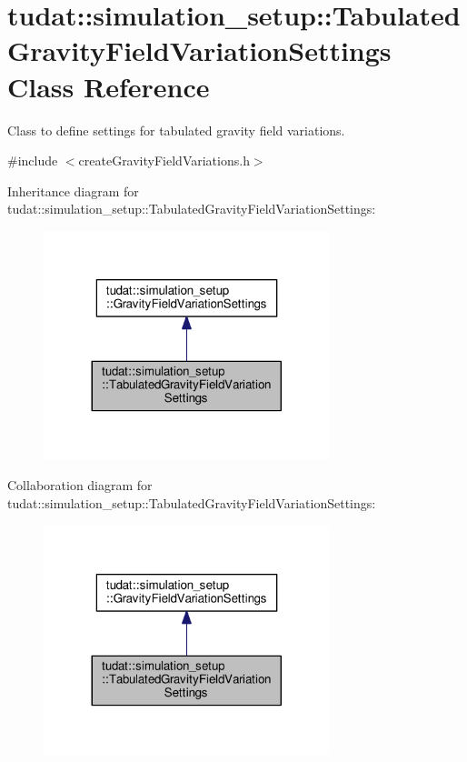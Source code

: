 \hypertarget{classtudat_1_1simulation__setup_1_1TabulatedGravityFieldVariationSettings}{}\section{tudat\+:\+:simulation\+\_\+setup\+:\+:Tabulated\+Gravity\+Field\+Variation\+Settings Class Reference}
\label{classtudat_1_1simulation__setup_1_1TabulatedGravityFieldVariationSettings}


Class to define settings for tabulated gravity field variations.  




{\ttfamily \#include $<$create\+Gravity\+Field\+Variations.\+h$>$}



Inheritance diagram for tudat\+:\+:simulation\+\_\+setup\+:\+:Tabulated\+Gravity\+Field\+Variation\+Settings\+:
\nopagebreak
\begin{figure}[H]
\begin{center}
\leavevmode
\includegraphics[width=236pt]{classtudat_1_1simulation__setup_1_1TabulatedGravityFieldVariationSettings__inherit__graph}
\end{center}
\end{figure}


Collaboration diagram for tudat\+:\+:simulation\+\_\+setup\+:\+:Tabulated\+Gravity\+Field\+Variation\+Settings\+:
\nopagebreak
\begin{figure}[H]
\begin{center}
\leavevmode
\includegraphics[width=236pt]{classtudat_1_1simulation__setup_1_1TabulatedGravityFieldVariationSettings__coll__graph}
\end{center}
\end{figure}
